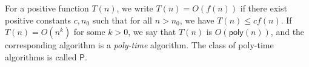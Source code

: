 For a positive function \( T(n) \), we write \( T(n) = O(f(n)) \) if there exist positive constants \( c, n_0 \) such that for all \( n > n_0 \), we have \( T(n) \leq cf(n) \).
If \( T(n) = O(n^k) \) for some \( k > 0 \), we say that \( T(n) \) is \( O(\mathsf{poly}(n)) \), and the corresponding algorithm is a \emph{poly-time} algorithm.
The class of poly-time algorithms is called \( \mathsf{P} \).
